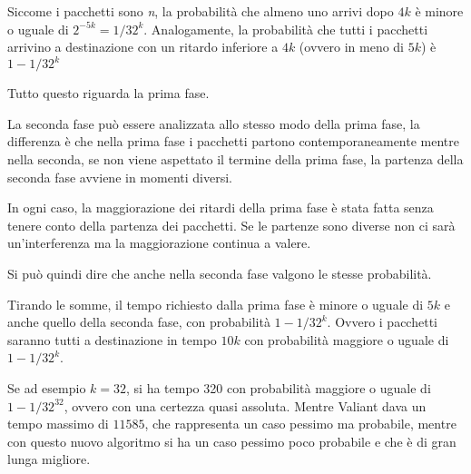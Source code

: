 Siccome i pacchetti sono \emph{n}, la probabilità che almeno uno arrivi dopo $4k$ è minore o uguale di $2^{-5k} = 1/32^k$. Analogamente, la probabilità che tutti i pacchetti arrivino a destinazione con un ritardo inferiore a $4k$ (ovvero in meno di $5k$) è $1-1/32^k$

Tutto questo riguarda la prima fase.

La seconda fase può essere analizzata allo stesso modo della prima fase, la differenza è che nella prima fase i pacchetti partono contemporaneamente mentre nella seconda, se non viene aspettato il termine della prima fase, la partenza della seconda fase avviene in momenti diversi.

In ogni caso, la maggiorazione dei ritardi della prima fase è stata fatta senza tenere conto della partenza dei pacchetti. 
Se le partenze sono diverse non ci sarà un'interferenza ma la maggiorazione continua a valere.

Si può quindi dire che anche nella seconda fase valgono le stesse probabilità.

Tirando le somme, il tempo richiesto dalla prima fase è minore o uguale di $5k$ e anche quello della seconda fase, con probabilità $ 1-1/32^{k}$.
Ovvero i pacchetti saranno tutti a destinazione in tempo $10k$ con probabilità maggiore o uguale di $1- 1/32^k$.

Se ad esempio $k = 32$, si ha tempo 320 con probabilità maggiore o uguale di $1 - 1/32^{32}$, ovvero con una certezza quasi assoluta. 
Mentre Valiant dava un tempo massimo di $11585$, che rappresenta un caso pessimo ma probabile, mentre con questo nuovo algoritmo si ha un caso pessimo poco probabile e che è di gran lunga migliore.
